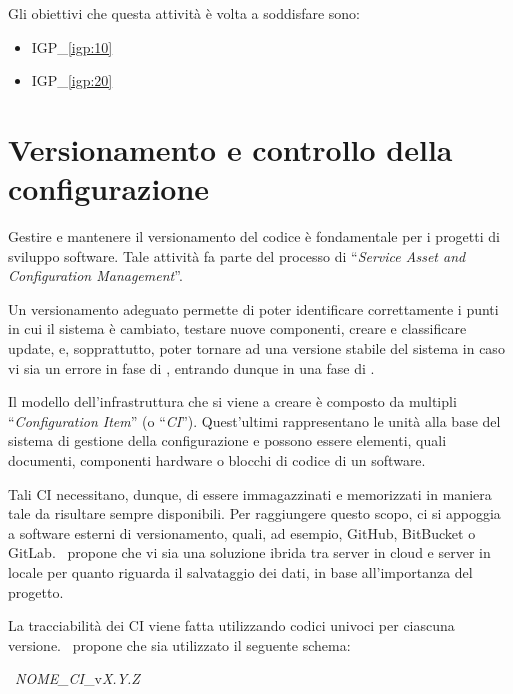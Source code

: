 		Gli obiettivi che questa attività è volta a soddisfare sono:
		\begin{itemize}[noitemsep]
			\renewcommand\labelitemi{--}
			\item {\color{pantone}IGP\_\ref{igp:10}}
			\item {\color{pantone}IGP\_\ref{igp:20}}
		\end{itemize}

\section{Versionamento e controllo della configurazione}\label{sec:configurazione}

	Gestire e mantenere il versionamento del codice è fondamentale per i progetti di sviluppo software.	
	Tale attività fa parte del processo di ``\textit{Service Asset and Configuration Management}''.
	
	Un versionamento adeguato permette di poter identificare correttamente i punti in cui il sistema è cambiato, testare nuove componenti, creare e classificare update, e, sopprattutto, poter tornare ad una versione stabile del sistema in caso vi sia un errore in fase di \rollout, entrando dunque in una fase di \rollback.
	
	Il modello dell'infrastruttura che si viene a creare è composto da multipli ``\textit{Configuration Item}'' (o ``\textit{CI}'').
	Quest'ultimi rappresentano le unità alla base del sistema di gestione della configurazione e possono essere elementi, quali documenti, componenti hardware o blocchi di codice di un software.
	
	Tali CI necessitano, dunque, di essere immagazzinati e memorizzati in maniera tale da risultare sempre disponibili.
	Per raggiungere questo scopo, ci si appoggia a software esterni di versionamento, quali, ad esempio, GitHub\cite{github}, BitBucket\cite{bitbucket} o GitLab\cite{gitlab}.
	\azienda~propone che vi sia una soluzione ibrida tra server in cloud e server in locale per quanto riguarda il salvataggio dei dati, in base all'importanza del progetto.
	
	La tracciabilità dei CI viene fatta utilizzando codici univoci per ciascuna versione.
	\azienda~propone che sia utilizzato il seguente schema:
	
	\begin{center}
		\vspace{-2mm}
		{\Large~\textit{NOME\_CI}\_v\textit{X.Y.Z}}
		\vspace{-2mm}
	\end{center}
	
